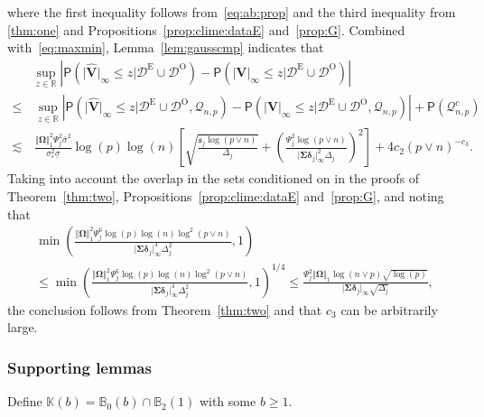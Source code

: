 \documentclass[11pt, a4paper]{article}
\newcommand{\mbf}{\mathbf}
\newcommand{\mc}{\mathcal}
\newcommand{\vep}{\varepsilon}
\renewcommand{\l}{\left}
\renewcommand{\r}{\right}
\def\wh{\widehat}
\newcommand{\p}{\mathsf{P}}
\newcommand{\R}{\mathbb{R}}
\newcommand{\tE}{\text{E}}
\newcommand{\tO}{\text{O}}
\theoremstyle{definition}
\theoremstyle{definition}
\theoremstyle{definition}
\theoremstyle{definition}
\theoremstyle{definition}
\theoremstyle{remark}
\theoremstyle{definition}
\theoremstyle{definition}
\theoremstyle{definition}
\begin{document}
where the first inequality follows from~\eqref{eq:ab:prop} and  the third inequality from \cref{thm:one} and Propositions~\ref{prop:clime:dataE} and~\ref{prop:G}. Combined with~\eqref{eq:maxmin}, Lemma~\ref{lem:gausscmp} indicates that
\begin{align*}
& \sup_{z \in \R} \l\vert \p\l( \vert \wh{\mbf V} \vert_\infty \le z \big\vert \mc D^{\tE} \cup \mc D^{\tO} \r) - \p\l( \vert \mbf V \vert_\infty \le z \big\vert \mc D^{\tE} \cup \mc D^{\tO} \r) \r\vert
\\
\le & \, \sup_{z \in \R} \l\vert \p\l( \vert \wh{\mbf V} \vert_\infty \le z \big\vert \mc D^{\tE} \cup \mc D^{\tO}, \mc Q_{n, p} \r) - \p\l( \vert \mbf V \vert_\infty \le z \big\vert \mc D^{\tE} \cup \mc D^{\tO}, \mc Q_{n, p} \r) \r\vert + \p(\mc Q_{n, p}^c)
\\
\lesssim & \, 
\frac{ \Vert \bm\Omega \Vert_1^2 \Psi_j^2 \bar{\sigma}^2 }{\sigma_\vep^2 \underline{\sigma}} \log(p)\log(n) \l[ \sqrt{\frac{\mathfrak{s}_j \log(p \vee n)}{\Delta_j}} + \l(\frac{\Psi_j^2 \log(p \vee n)}{\vert \bm\Sigma \bm\delta_j \vert_\infty^2 \Delta_j} \r)^2 \r] + 4 c_2 (p \vee n)^{-c_3}.
\end{align*}
Taking into account the overlap in the sets conditioned on in the proofs of Theorem~\ref{thm:two}, Propositions~\ref{prop:clime:dataE} and~\ref{prop:G}, and noting that 
\begin{multline*}
\min\l(\frac{ \Vert \bm\Omega \Vert_1^2 \Psi_j^6\log(p)\log(n)\log^2(p \vee n)}{\vert\bm\Sigma\bm\delta_j\vert_\infty^4\Delta_j^2}, 1\r)  \\ \le
\min \l(\frac{ \Vert \bm\Omega \Vert_1^2 \Psi_j^6\log(p)\log(n)\log^2(p \vee n)}{\vert\bm\Sigma\bm\delta_j\vert_\infty^4\Delta_j^2}, 1 \r)^{1/4} \le \frac{\Psi_j^2\Vert\bm\Omega\Vert_1\log(n\vee p)\sqrt{\log(p)}}{\vert\bm\Sigma\bm\delta_j\vert_{\infty}\sqrt{\Delta_j}},    
\end{multline*}
the conclusion follows from Theorem~\ref{thm:two} and that $c_3$ can be arbitrarily large.

\subsubsection{Supporting lemmas}

Define $\mathbb{K}(b) = \mathbb{B}_0(b) \cap \mathbb{B}_2(1)$
with some $b \ge 1$.
\end{document}
